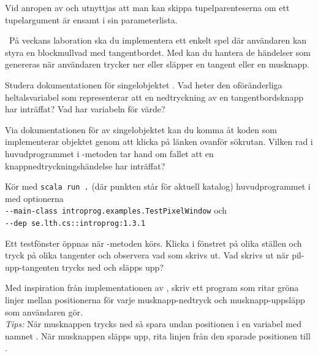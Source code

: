 \SubtaskSolved Vid anropen av  och  utnyttjas att man kan skippa tupelparenteserna om ett tupelargument är ensamt i sin parameterlista.



\QUESTEND




\QUESTBEGIN

\Task \what~På veckans laboration ska du implementera ett enkelt spel där användaren kan styra en blockmullvad med tangentbordet. Med  kan du hantera de händelser som genereras när användaren trycker ner eller släpper en tangent eller en musknapp.


\Subtask Studera dokumentationen för singelobjektet . Vad heter den oföränderliga heltalsvariabel som representerar att en nedtryckning av en tangentbordsknapp har inträffat? Vad har variabeln för värde?

\Subtask Via dokumentationen för av singelobjektet  kan du komma åt koden som implementerar objektet genom att klicka på länken  ovanför sökrutan. Vilken rad i huvudprogrammet i -metoden tar hand om fallet att en knappnedtryckningshändelse har inträffat?

\Subtask Kör med \texttt{scala run .} (där punkten står för aktuell katalog) huvudprogrammet i  med optionerna\\
\texttt{-{}-main-class introprog.examples.TestPixelWindow} och \\
\texttt{-{}-dep se.lth.cs::introprog:1.3.1} 

Ett testfönster öppnas när -metoden körs. Klicka i fönstret på olika ställen och tryck på olika tangenter och observera vad som skrivs ut. Vad skrivs ut när pil-upp-tangenten trycks ned och släpps upp?

\Subtask Med inspiration från implementationen av , skriv ett program som ritar gröna linjer mellan positionerna för varje musknapp-nedtryck och musknapp-uppsläpp som användaren gör. \\\emph{Tips:} När musknappen trycks ned så spara undan positionen i en variabel med namnet . När musknappen släpps upp, rita linjen från den sparade positionen till .

\SOLUTION

\TaskSolved \what~

